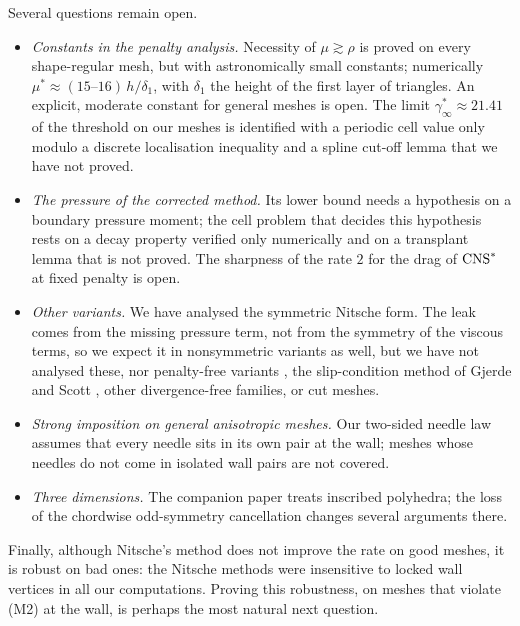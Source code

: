 Several questions remain open.
\begin{itemize}
\item \emph{Constants in the penalty analysis.} Necessity of $\mu\gtrsim\rho$ is proved on every shape-regular mesh, but with astronomically small constants; numerically $\mu^\ast\approx(15\text{--}16)\,h/\delta_1$, with $\delta_1$ the height of the first layer of triangles. An explicit, moderate constant for general meshes is open. The limit $\gamma^\ast_\infty\approx21.41$ of the threshold on our meshes is identified with a periodic cell value only modulo a discrete localisation inequality and a spline cut-off lemma that we have not proved.
\item \emph{The pressure of the corrected method.} Its lower bound needs a hypothesis on a boundary pressure moment; the cell problem that decides this hypothesis rests on a decay property verified only numerically and on a transplant lemma that is not proved. The sharpness of the rate $2$ for the drag of $\mathrm{CNS}^\ast$ at fixed penalty is open.
\item \emph{Other variants.} We have analysed the symmetric Nitsche form. The leak comes from the missing pressure term, not from the symmetry of the viscous terms, so we expect it in nonsymmetric variants as well, but we have not analysed these, nor penalty-free variants \cite{Burman2012,BoiveauBurman2016}, the slip-condition method of Gjerde and Scott \cite{GjerdeScott2022}, other divergence-free families, or cut meshes.
\item \emph{Strong imposition on general anisotropic meshes.} Our two-sided needle law assumes that every needle sits in its own pair at the wall; meshes whose needles do not come in isolated wall pairs are not covered.
\item \emph{Three dimensions.} The companion paper \cite{PadhiThreeD} treats inscribed polyhedra; the loss of the chordwise odd-symmetry cancellation changes several arguments there.
\end{itemize}
Finally, although Nitsche's method does not improve the rate on good meshes, it is robust on bad ones: the Nitsche methods were insensitive to locked wall vertices in all our computations. Proving this robustness, on meshes that violate (M2) at the wall, is perhaps the most natural next question.
